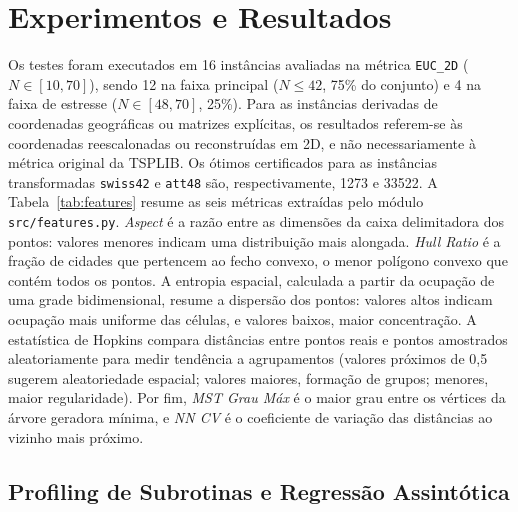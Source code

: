 \documentclass[12pt]{article}
\begin{document}
\section{Experimentos e Resultados}

Os testes foram executados em 16 instâncias avaliadas na métrica \texttt{EUC\_2D} ($N \in [10, 70]$), sendo 12 na faixa principal ($N \le 42$, 75\% do conjunto) e 4 na faixa de estresse ($N \in [48, 70]$, 25\%). Para as instâncias derivadas de coordenadas geográficas ou matrizes explícitas, os resultados referem-se às coordenadas reescalonadas ou reconstruídas em 2D, e não necessariamente à métrica original da TSPLIB. Os ótimos certificados para as instâncias transformadas \texttt{swiss42} e \texttt{att48} são, respectivamente, 1273 e 33522. A Tabela~\ref{tab:features} resume as seis métricas extraídas pelo módulo \texttt{src/features.py}. \textit{Aspect} é a razão entre as dimensões da caixa delimitadora dos pontos: valores menores indicam uma distribuição mais alongada. \textit{Hull Ratio} é a fração de cidades que pertencem ao fecho convexo, o menor polígono convexo que contém todos os pontos. A entropia espacial, calculada a partir da ocupação de uma grade bidimensional, resume a dispersão dos pontos: valores altos indicam ocupação mais uniforme das células, e valores baixos, maior concentração. A estatística de Hopkins compara distâncias entre pontos reais e pontos amostrados aleatoriamente para medir tendência a agrupamentos (valores próximos de 0,5 sugerem aleatoriedade espacial; valores maiores, formação de grupos; menores, maior regularidade). Por fim, \textit{MST Grau Máx} é o maior grau entre os vértices da árvore geradora mínima, e \textit{NN CV} é o coeficiente de variação das distâncias ao vizinho mais próximo.

\begin{table}[htb]
\centering
\caption{Características geométricas e topológicas extraídas das 16 instâncias TSPLIB.}
\label{tab:features}
\footnotesize

\end{table}

\subsection{Profiling de Subrotinas e Regressão Assintótica}
\end{document}
